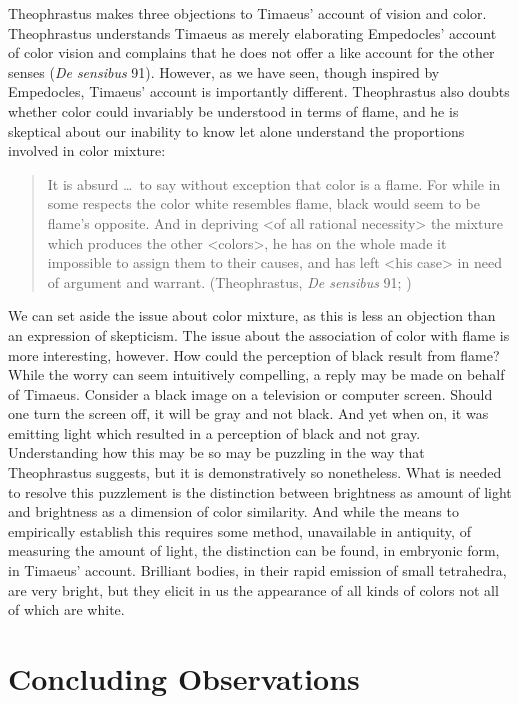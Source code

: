Theophrastus makes three objections to Timaeus' account of vision and color. Theo\-phrastus understands Timaeus as merely elaborating Empedocles' account of color vision and complains that he does not offer a like account for the other senses (\emph{De sensibus} 91). However, as we have seen, though inspired by Empedocles, Timaeus' account is importantly different. Theophrastus also doubts whether color could invariably be understood in terms of flame, and he is skeptical about our inability to know let alone understand the proportions involved in color mixture:
\begin{quote}
	It is absurd \ldots\ to say without exception that color is a flame. For while in some respects the color white resembles flame, black would seem to be flame's opposite. And in depriving <of all rational necessity> the mixture which produces the other <colors>, he has on the whole made it impossible to assign them to their causes, and has left <his case> in need of argument and warrant. (Theophrastus, \emph{De sensibus} 91; \citealt[149--50]{Stratton:1917vn})
\end{quote}
We can set aside the issue about color mixture, as this is less an objection than an expression of skepticism. The issue about the association of color with flame is more interesting, however. How could the perception of black result from flame? While the worry can seem intuitively compelling, a reply may be made on behalf of Timaeus. Consider a black image on a television or computer screen. Should one turn the screen off, it will be gray and not black. And yet when on, it was emitting light which resulted in a perception of black and not gray. Understanding how this may be so may be puzzling in the way that Theophrastus suggests, but it is demonstratively so nonetheless. What is needed to resolve this puzzlement is the distinction between brightness as amount of light and brightness as a dimension of color similarity. And while the means to empirically establish this requires some method, unavailable in antiquity, of measuring the amount of light, the distinction can be found, in embryonic form, in Timaeus' account. Brilliant bodies, in their rapid emission of small tetrahedra, are very bright, but they elicit in us the appearance of all kinds of colors not all of which are white.


\section{Concluding Observations} %
\label{sec:concluding_observations_pp}

